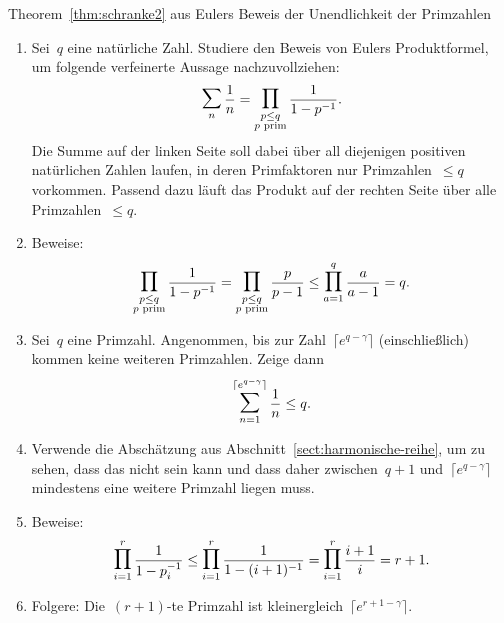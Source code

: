 \documentclass[twoside]{../zirkelblatt1415}
\theoremstyle{definition}
\theoremstyle{plain}
\theoremstyle{remark}
\newcommand{\prim}[1]{\text{\textnormal{$#1$ prim}}}
\newcommand{\bigsum}{\mathop{\mathlarger{\mathlarger{\sum}}}}
\newcommand{\bigprod}{\mathop{\mathlarger{\mathlarger{\prod}}}}
\begin{document}
\begin{aufgabe}{Theorem~\ref{thm:schranke2} aus Eulers Beweis der
Unendlichkeit der Primzahlen}
\begin{enumerate}
\item Sei~$q$ eine natürliche Zahl. Studiere den Beweis von Eulers
Produktformel, um folgende verfeinerte Aussage nachzuvollziehen:
\[ \bigsum_n \frac{1}{n} = \bigprod_{\substack{p \leq q \\ \prim{p}}} \frac{1}{1 -
p^{-1}}. \]
Die Summe auf der linken Seite soll dabei über all diejenigen positiven
natürlichen Zahlen laufen, in deren Primfaktoren nur Primzahlen~$\leq q$
vorkommen. Passend dazu läuft das Produkt auf der rechten Seite über alle
Primzahlen~$\leq q$.
\item Beweise:
\[
  \bigprod_{\substack{p \leq q \\ \prim{p}}} \frac{1}{1 - p^{-1}} =
  \bigprod_{\substack{p \leq q \\ \prim{p}}} \frac{p}{p - 1} \leq
  \bigprod_{a=1}^q \frac{a}{a - 1} = q. \]
\item Sei~$q$ eine Primzahl. Angenommen, bis zur Zahl~$\lceil e^{q-\gamma}
\rceil$ (einschließlich) kommen keine weiteren Primzahlen. Zeige dann
\[ \bigsum_{n=1}^{\lceil e^{q-\gamma} \rceil} \frac{1}{n} \leq q. \]
\item Verwende die Abschätzung aus Abschnitt~\ref{sect:harmonische-reihe}, um
zu sehen, dass das nicht sein kann und dass daher zwischen~$q+1$ und~$\lceil
e^{q-\gamma} \rceil$ mindestens eine weitere Primzahl liegen muss.
\item Beweise:
\[
  \bigprod_{i=1}^r \frac{1}{1 - p_i^{-1}} \leq
  \bigprod_{i=1}^r \frac{1}{1 - (i+1)^{-1}} =
  \bigprod_{i=1}^r \frac{i+1}{i} = r+1. \]
\item Folgere: Die~$(r+1)$-te Primzahl ist kleinergleich~$\lceil e^{r+1-\gamma} \rceil$.
\end{enumerate}\fixlistspacing
\end{aufgabe}
\end{document}
